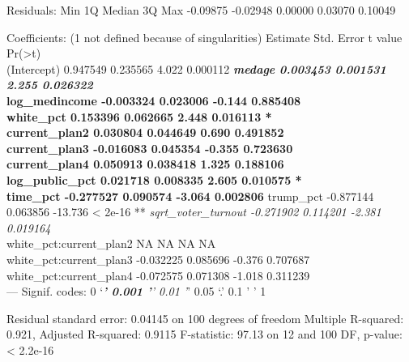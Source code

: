 \documentclass[
]{article}
\begin{document}
Residuals: Min 1Q Median 3Q Max -0.09875 -0.02948 0.00000 0.03070
0.10049

Coefficients: (1 not defined because of singularities) Estimate Std.
Error t value Pr(\textgreater\textbar t\textbar)\\
(Intercept) 0.947549 0.235565 4.022 0.000112 \textbf{\emph{ medage
0.003453 0.001531 2.255 0.026322 }\\
log\_medincome -0.003324 0.023006 -0.144 0.885408\\
white\_pct 0.153396 0.062665 2.448 0.016113 *\\
current\_plan2 0.030804 0.044649 0.690 0.491852\\
current\_plan3 -0.016083 0.045354 -0.355 0.723630\\
current\_plan4 0.050913 0.038418 1.325 0.188106\\
log\_public\_pct 0.021718 0.008335 2.605 0.010575 *\\
time\_pct -0.277527 0.090574 -3.064 0.002806 } trump\_pct -0.877144
0.063856 -13.736 \textless{} 2e-16 **\emph{ sqrt\_voter\_turnout
-0.271902 0.114201 -2.381 0.019164 }\\
white\_pct:current\_plan2 NA NA NA NA\\
white\_pct:current\_plan3 -0.032225 0.085696 -0.376 0.707687\\
white\_pct:current\_plan4 -0.072575 0.071308 -1.018 0.311239\\
--- Signif. codes: 0 `\emph{\textbf{' 0.001 '}' 0.01 '}' 0.05 `.' 0.1 '
' 1

Residual standard error: 0.04145 on 100 degrees of freedom Multiple
R-squared: 0.921, Adjusted R-squared: 0.9115 F-statistic: 97.13 on 12
and 100 DF, p-value: \textless{} 2.2e-16
\end{document}

